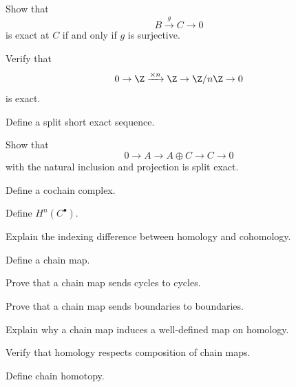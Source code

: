 \begin{exercise}[2]
Show that
\[ B\xrightarrow{g}C\to0 \]
is exact at \(C\) if and only if \(g\) is surjective.
\end{exercise}

\begin{exercise}[2]
Verify that
\[ 0\to\Z\xrightarrow{\times n}\Z\to\Z/n\Z\to0 \]
is exact.
\end{exercise}

\begin{exercise}[1]
Define a split short exact sequence.
\end{exercise}

\begin{exercise}[2]
Show that
\[ 0\to A\to A\oplus C\to C\to0 \]
with the natural inclusion and projection is split exact.
\end{exercise}

\begin{exercise}[1]
Define a cochain complex.
\end{exercise}

\begin{exercise}[1]
Define \(H^n(C^\bullet)\).
\end{exercise}

\begin{exercise}[1]
Explain the indexing difference between homology and cohomology.
\end{exercise}

\begin{exercise}[1]
Define a chain map.
\end{exercise}

\begin{exercise}[2]
Prove that a chain map sends cycles to cycles.
\end{exercise}

\begin{exercise}[2]
Prove that a chain map sends boundaries to boundaries.
\end{exercise}

\begin{exercise}[2]
Explain why a chain map induces a well-defined map on homology.
\end{exercise}

\begin{exercise}[2]
Verify that homology respects composition of chain maps.
\end{exercise}

\begin{exercise}[1]
Define chain homotopy.
\end{exercise}

